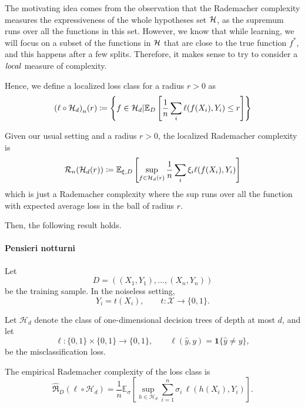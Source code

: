 \documentclass[reqno]{amsart}
\begin{document}
The motivating idea comes from the observation that the Rademacher complexity measures the expressiveness of the whole hypotheses set $\mathcal{H}$, as the supremum runs over all the functions in this set. However, we know that while learning, we will focus on a subset of the functions in $\mathcal{H}$ that are close to the true function $f^*$, and this happens after a few splits. Therefore, it makes sense to try to consider a $\it local\/$ measure of complexity. 

Hence, we define a localized loss class for a radius $r>0$ as 
\begin{equation}
   {(\ell\circ\mathcal H_d)}_n(r) \coloneq \left\{ f\in\mathcal{H}_d \vert \mathbb{E}_D \left[ \frac{1}{n}\sum_i \ell(f(X_i),Y_i) \le r \right]\right \}
\end{equation}

\begin{definition}
    Given our usual setting and a radius $r>0$, the localized Rademacher complexity is
    \begin{equation}
        \mathcal R_n(\mathcal H_d (r)) \coloneq \mathbb{E}_{\xi,D} \left[ \sup_{f\in{\mathcal{H}_d}(r)} \frac{1}{n}\sum_i \xi_i \ell(f(X_i),Y_i) \right]
    \end{equation}
    which is just a Rademacher complexity where the sup runs over all the function with expected average loss in the ball of radius $r$. 
\end{definition}

Then, the following result holds.

\begin{theorem}
    
\end{theorem}


\newpage
\paragraph{Pensieri notturni}
Let
\[
D=((X_1,Y_1),\ldots,(X_n,Y_n))
\]
be the training sample. In the noiseless setting,
\[
Y_i=t(X_i),
\qquad
t:\mathcal X\to\{0,1\}.
\]

Let $\mathcal H_d$ denote the class of one-dimensional decision trees of depth at most $d$, and let
\[
\ell:\{0,1\}\times\{0,1\}\to\{0,1\},
\qquad
\ell(\hat y,y)=\mathbf 1\{\hat y\neq y\},
\]
be the misclassification loss.

The empirical Rademacher complexity of the loss class is
\[
\widehat{\mathfrak R}_{D}(\ell\circ\mathcal H_d)
=
\frac1n
\mathbb E_\sigma
\left[
\sup_{h\in\mathcal H_d}
\sum_{i=1}^n
\sigma_i\,
\ell(h(X_i),Y_i)
\right].
\]
\end{document}
